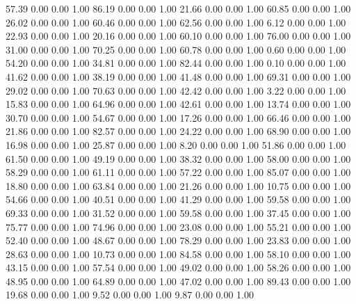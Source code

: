    57.39   0.00   0.00   1.00
   86.19   0.00   0.00   1.00
   21.66   0.00   0.00   1.00
   60.85   0.00   0.00   1.00
   26.02   0.00   0.00   1.00
   60.46   0.00   0.00   1.00
   62.56   0.00   0.00   1.00
    6.12   0.00   0.00   1.00
   22.93   0.00   0.00   1.00
   20.16   0.00   0.00   1.00
   60.10   0.00   0.00   1.00
   76.00   0.00   0.00   1.00
   31.00   0.00   0.00   1.00
   70.25   0.00   0.00   1.00
   60.78   0.00   0.00   1.00
    0.60   0.00   0.00   1.00
   54.20   0.00   0.00   1.00
   34.81   0.00   0.00   1.00
   82.44   0.00   0.00   1.00
    0.10   0.00   0.00   1.00
   41.62   0.00   0.00   1.00
   38.19   0.00   0.00   1.00
   41.48   0.00   0.00   1.00
   69.31   0.00   0.00   1.00
   29.02   0.00   0.00   1.00
   70.63   0.00   0.00   1.00
   42.42   0.00   0.00   1.00
    3.22   0.00   0.00   1.00
   15.83   0.00   0.00   1.00
   64.96   0.00   0.00   1.00
   42.61   0.00   0.00   1.00
   13.74   0.00   0.00   1.00
   30.70   0.00   0.00   1.00
   54.67   0.00   0.00   1.00
   17.26   0.00   0.00   1.00
   66.46   0.00   0.00   1.00
   21.86   0.00   0.00   1.00
   82.57   0.00   0.00   1.00
   24.22   0.00   0.00   1.00
   68.90   0.00   0.00   1.00
   16.98   0.00   0.00   1.00
   25.87   0.00   0.00   1.00
    8.20   0.00   0.00   1.00
   51.86   0.00   0.00   1.00
   61.50   0.00   0.00   1.00
   49.19   0.00   0.00   1.00
   38.32   0.00   0.00   1.00
   58.00   0.00   0.00   1.00
   58.29   0.00   0.00   1.00
   61.11   0.00   0.00   1.00
   57.22   0.00   0.00   1.00
   85.07   0.00   0.00   1.00
   18.80   0.00   0.00   1.00
   63.84   0.00   0.00   1.00
   21.26   0.00   0.00   1.00
   10.75   0.00   0.00   1.00
   54.66   0.00   0.00   1.00
   40.51   0.00   0.00   1.00
   41.29   0.00   0.00   1.00
   59.58   0.00   0.00   1.00
   69.33   0.00   0.00   1.00
   31.52   0.00   0.00   1.00
   59.58   0.00   0.00   1.00
   37.45   0.00   0.00   1.00
   75.77   0.00   0.00   1.00
   74.96   0.00   0.00   1.00
   23.08   0.00   0.00   1.00
   55.21   0.00   0.00   1.00
   52.40   0.00   0.00   1.00
   48.67   0.00   0.00   1.00
   78.29   0.00   0.00   1.00
   23.83   0.00   0.00   1.00
   28.63   0.00   0.00   1.00
   10.73   0.00   0.00   1.00
   84.58   0.00   0.00   1.00
   58.10   0.00   0.00   1.00
   43.15   0.00   0.00   1.00
   57.54   0.00   0.00   1.00
   49.02   0.00   0.00   1.00
   58.26   0.00   0.00   1.00
   48.95   0.00   0.00   1.00
   64.89   0.00   0.00   1.00
   47.02   0.00   0.00   1.00
   89.43   0.00   0.00   1.00
   19.68   0.00   0.00   1.00
    9.52   0.00   0.00   1.00
    9.87   0.00   0.00   1.00
